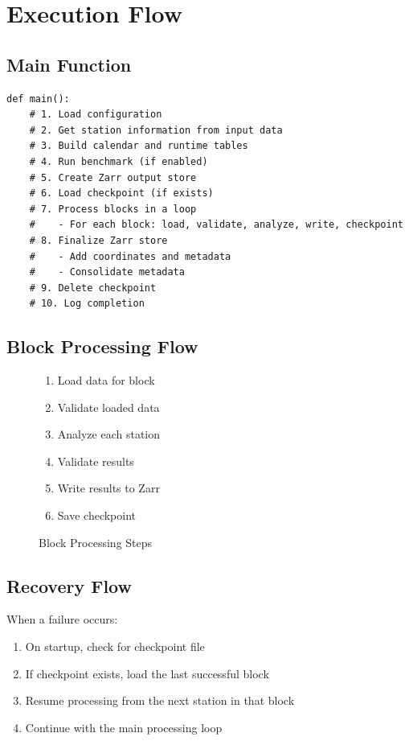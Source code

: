 ﻿\documentclass[12pt,a4paper]{report}
\begin{document}
\chapter{Execution Flow}
\section{Main Function}
\begin{lstlisting}[caption=Main Execution Flow]
def main():
    # 1. Load configuration
    # 2. Get station information from input data
    # 3. Build calendar and runtime tables
    # 4. Run benchmark (if enabled)
    # 5. Create Zarr output store
    # 6. Load checkpoint (if exists)
    # 7. Process blocks in a loop
    #    - For each block: load, validate, analyze, write, checkpoint
    # 8. Finalize Zarr store
    #    - Add coordinates and metadata
    #    - Consolidate metadata
    # 9. Delete checkpoint
    # 10. Log completion
\end{lstlisting}

\section{Block Processing Flow}
\begin{figure}[H]
    \centering
    \begin{enumerate}
        \item Load data for block
        \item Validate loaded data
        \item Analyze each station
        \item Validate results
        \item Write results to Zarr
        \item Save checkpoint
    \end{enumerate}
    \caption{Block Processing Steps}
    \label{fig:block_flow}
\end{figure}

\section{Recovery Flow}
When a failure occurs:
\begin{enumerate}
    \item On startup, check for checkpoint file
    \item If checkpoint exists, load the last successful block
    \item Resume processing from the next station in that block
    \item Continue with the main processing loop
\end{enumerate}
\end{document}
